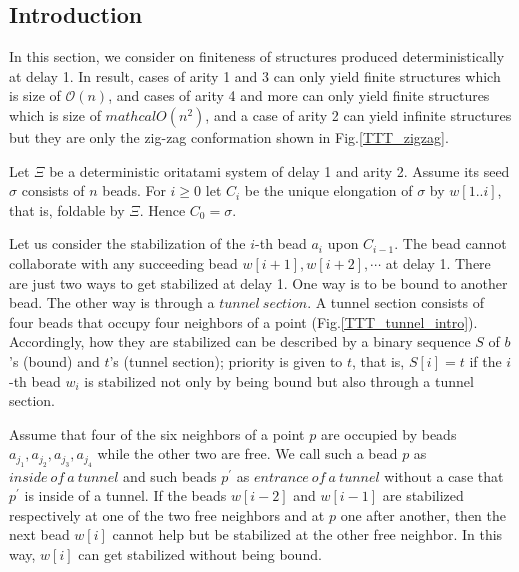 \documentclass[runningheads]{llncs}
\begin{document}
\subsection{Introduction}


In this section, we consider on finiteness of structures produced deterministically at delay 1. In result, cases of arity 1 and 3 can only yield finite structures which is size of $\mathcal{O} (n)$, and cases of arity 4 and more can only yield finite structures which is size of $mathcal{O} (n^2)$, and a case of arity 2 can yield infinite structures but they are only the zig-zag conformation shown in Fig.\ref{TTT_zigzag}. 



Let $\Xi$ be a deterministic oritatami system of delay 1 and arity 2. Assume its seed $\sigma$ consists of $n$ beads.
For $i \geq 0$ let $C_i$ be the unique elongation of $\sigma$ by $w[1..i]$, that is, foldable by $\Xi$. Hence $C_0 = \sigma$.


Let us consider the stabilization of the $i$-th bead $a_i$ upon $C_{i-1}$. The bead cannot collaborate with any succeeding bead $w[i+1],w[i+2],\cdots$ at delay 1. There are just two ways to get stabilized at delay 1. One way is to be bound to another bead. The other way is through a $tunnel\ section$. A tunnel section consists of four beads that occupy four neighbors of a point (Fig.\ref{TTT_tunnel_intro}). 
Accordingly, how they are stabilized can be described by a binary sequence $S$ of $b$'s (bound) and $t$'s (tunnel section); priority is given to $t$, that is, $S[i] = t$ if the $i$-th bead $w_i$ is stabilized not only by being bound but also through a tunnel section. 

Assume that four of the six neighbors of a point $p$ are occupied by beads $a_{j_1},a_{j_2},a_{j_3},a_{j_4}$ while the other two are free. We call such a bead $p$ as $inside\ of\ a\ tunnel$ and such beads $p^\prime$ as $entrance\ of\ a\ tunnel$ without a case that $p^\prime$ is inside of a tunnel. If the beads $w[i-2]$ and $w[i-1]$ are stabilized respectively at one of the two free neighbors and at $p$ one after another, then the next bead $w[i]$ cannot help but be stabilized at the other free neighbor. In this way, $w[i]$ can get stabilized without being bound.
\end{document}
